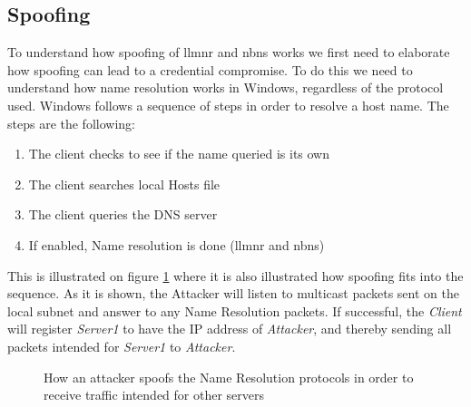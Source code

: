 \documentclass{article}
\begin{document}
\subsection{Spoofing}
\label{sec:spoofing}
To understand how spoofing of \gls{llmnr} and \gls{nbns} works we first need to elaborate how spoofing can lead to a credential compromise. To do this we need to understand how name resolution works in Windows, regardless of the protocol used. Windows follows a sequence of steps in order to resolve a host name.\cite{url:microsoft:name-resolution-order} The steps are the following:
\begin{enumerate}
	\item The client checks to see if the name queried is its own
	\item The client searches local Hosts file
	\item The client queries the DNS server
	\item If enabled, Name resolution is done (\gls{llmnr} and \gls{nbns})
\end{enumerate}

This is illustrated on figure \ref{fig:host-resolution-sequence-and-spoofing} where it is also illustrated how spoofing fits into the sequence. As it is shown, the Attacker will listen to multicast packets sent on the local subnet and answer to any Name Resolution packets. If successful, the \emph{Client} will register \emph{Server1} to have the IP address of \emph{Attacker}, and thereby sending all packets intended for \emph{Server1} to \emph{Attacker}.

\begin{figure}[!ht]
	\centering
	\caption{How an attacker spoofs the Name Resolution protocols in order to receive traffic intended for other servers}
	\label{fig:host-resolution-sequence-and-spoofing}
\end{figure}
\end{document}
